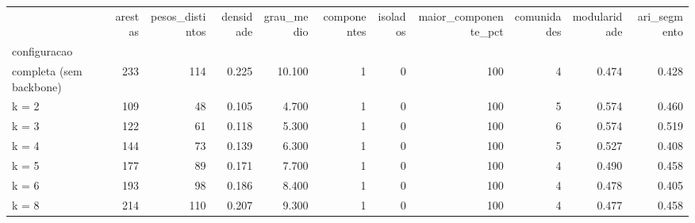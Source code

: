 \begin{tabular}{lrrrrrrrrrr}
\toprule
 & arestas & pesos\_distintos & densidade & grau\_medio & componentes & isolados & maior\_componente\_pct & comunidades & modularidade & ari\_segmento \\
configuracao &  &  &  &  &  &  &  &  &  &  \\
\midrule
completa (sem backbone) & 233 & 114 & 0.225 & 10.100 & 1 & 0 & 100 & 4 & 0.474 & 0.428 \\
k = 2 & 109 & 48 & 0.105 & 4.700 & 1 & 0 & 100 & 5 & 0.574 & 0.460 \\
k = 3 & 122 & 61 & 0.118 & 5.300 & 1 & 0 & 100 & 6 & 0.574 & 0.519 \\
k = 4 & 144 & 73 & 0.139 & 6.300 & 1 & 0 & 100 & 5 & 0.527 & 0.408 \\
k = 5 & 177 & 89 & 0.171 & 7.700 & 1 & 0 & 100 & 4 & 0.490 & 0.458 \\
k = 6 & 193 & 98 & 0.186 & 8.400 & 1 & 0 & 100 & 4 & 0.478 & 0.405 \\
k = 8 & 214 & 110 & 0.207 & 9.300 & 1 & 0 & 100 & 4 & 0.477 & 0.458 \\
\bottomrule
\end{tabular}
